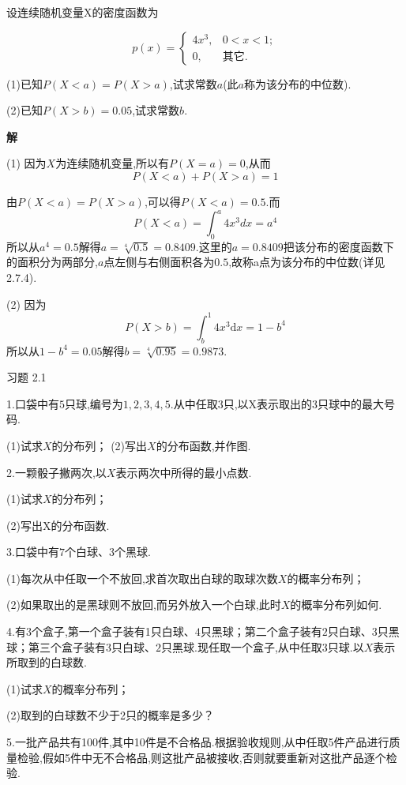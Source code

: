 \begin{example}
	设连续随机变量X的密度函数为
	
	\[ 
	p(x)=\left\{\begin{array}{ll}
	{4 x^{3},} & {0<x<1}; \\ 
	{0},&{\text{其它}}.
	\end{array}\right.
	\]
	
	(1)已知$ P(X<a)=P(X>a) $,试求常数$ a $(此$ a $称为该分布的中位数).
	
	(2)已知$ P(X>b)=0.05 $,试求常数$ b $.
	
	\textbf{解}
	
	(1) 因为$ X $为连续随机变量,所以有$ P(X=a)=0 $,从而
	\[ 
	P(X<a)+P(X>a)=1
	\]
	
	由$ P(X<a)=P(X>a) $,可以得$ P(X<a)=0.5 $.而
	\[ 
	P(X<a)=\int_{0}^{a} 4 x^{3} d x=a^{4}
	\]
	所以从$ a^4=0.5 $解得$a=\sqrt[4]{0.5}=0.8409$.这里的$ a=0.8409 $把该分布的密度函数下的面积分为两部分,$ a $点左侧与右侧面积各为$ 0.5 $,故称a点为该分布的中位数(详见2.7.4).
	
	(2) 因为
	\[ 
	P(X>b)=\int_{b}^{1} 4 x^{3} \mathrm{d} x=1-b^{4}
	\]
	所以从$1-b^{4}=0.05$解得$b=\sqrt[4]{0.95}=0.9873$.
\end{example}

习题 2.1

1.口袋中有$ 5 $只球,编号为$ 1,2,3,4,5 $.从中任取$ 3 $只,以X表示取出的$ 3 $只球中的最大号码.

(1)试求$ X $的分布列；
(2)写出$ X $的分布函数,并作图.

2.一颗骰子撇两次,以$ X $表示两次中所得的最小点数.

(1)试求$ X $的分布列；

(2)写出X的分布函数.

3.口袋中有$ 7 $个白球、$ 3 $个黑球.

(1)每次从中任取一个不放回,求首次取出白球的取球次数$ X $的概率分布列；

(2)如果取出的是黑球则不放回,而另外放入一个白球,此时$ X $的概率分布列如何.

4.有$ 3 $个盒子,第一个盒子装有1只白球、$ 4 $只黑球；第二个盒子装有$ 2 $只白球、3只黑球；第三个盒子装有$ 3 $只白球、$ 2 $只黑球.现任取一个盒子,从中任取3只球.以$ X $表示所取到的白球数.

(1)试求$ X $的概率分布列；

(2)取到的白球数不少于2只的概率是多少？

5.一批产品共有100件,其中10件是不合格品.根据验收规则,从中任取5件产品进行质量检验,假如5件中无不合格品,则这批产品被接收,否则就要重新对这批产品逐个检验.

